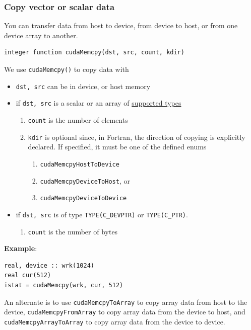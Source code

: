 \subsubsection{Copy vector or scalar data}
\label{sec:copy-data}

You can transfer data from host to device, from device to host, or
from one device array to another. 
\begin{lstlisting}
integer function cudaMemcpy(dst, src, count, kdir)
\end{lstlisting}
We use \verb.cudaMemcpy(). to copy data with
\begin{itemize}
\item \verb!dst, src! can be in device, or host memory
\item if \verb!dst, src! is a scalar or an array of
  \hyperref[sec:datatype-data-device]{supported types}
  \begin{enumerate}
  \item \verb!count! is the number of elements
  \item \verb!kdir!  is optional since, in Fortran, the direction of
    copying is explicitly declared. If specified, it must be one of
    the defined enums
  \begin{enumerate}
  \item \verb!cudaMemcpyHostToDevice!
  \item \verb!cudaMemcpyDeviceToHost!, or
  \item \verb!cudaMemcpyDeviceToDevice!
  \end{enumerate}
  \end{enumerate}
\item if \verb!dst, src! is of type \verb!TYPE(C_DEVPTR)! or
  \verb!TYPE(C_PTR)!. 
  \begin{enumerate}
  \item \verb!count! is the number of bytes
  \end{enumerate}
\end{itemize}

{\bf Example}: 
\begin{lstlisting}
real, device :: wrk(1024)
real cur(512)
istat = cudaMemcpy(wrk, cur, 512)
\end{lstlisting}

An alternate is to use \verb!cudaMemcpyToArray! to copy array data
from host to the device, \verb!cudaMemcpyFromArray! to copy array data
from the device to host, and \verb!cudaMemcpyArrayToArray! to copy
array data from the device to device.

